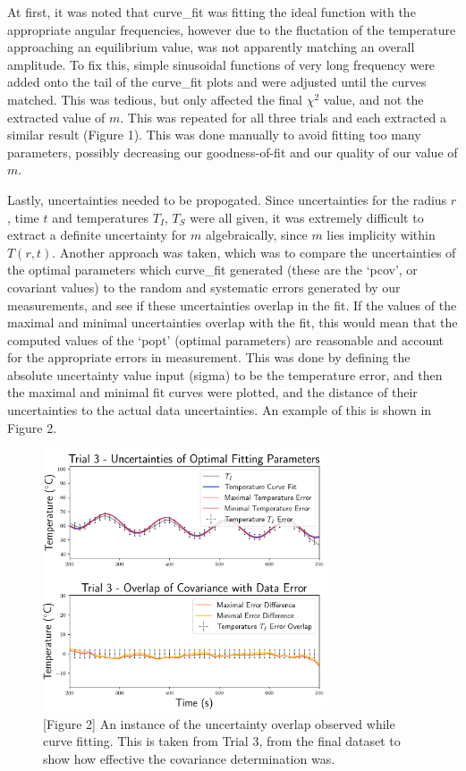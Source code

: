 \documentclass[11pt]{article}
\begin{document}
\begin{multicols}{2}
    At first, it was noted that curve\_fit was fitting the ideal function with the appropriate angular frequencies, however due to the fluctation of the temperature approaching an equilibrium value, was not apparently matching an overall amplitude. To fix this, simple sinusoidal functions of very long frequency were added onto the tail of the curve\_fit plots and were adjusted until the curves matched. This was tedious, but only affected the final $\chi^2$ value, and not the extracted value of $m$. This was repeated for all three trials and each extracted a similar result (Figure 1). This was done manually to avoid fitting too many parameters, possibly decreasing our goodness-of-fit and our quality of our value of $m$. 

    Lastly, uncertainties needed to be propogated. Since uncertainties for the radius $r$, time $t$ and temperatures $T_I, \, T_S$ were all given, it was extremely difficult to extract a definite uncertainty for $m$ algebraically, since $m$ lies implicity within $T(r, t)$. Another approach was taken, which was to compare the uncertainties of the optimal parameters which curve\_fit generated (these are the `pcov', or covariant values) to the random and systematic errors generated by our measurements, and see if these uncertainties overlap in the fit. If the values of the maximal and minimal uncertainties overlap with the fit, this would mean that the computed values of the `popt' (optimal parameters) are reasonable and account for the appropriate errors in measurement. This was done by defining the absolute uncertainty value input (sigma) to be the temperature error, and then the maximal and minimal fit curves were plotted, and the distance of their uncertainties to the actual data uncertainties. An example of this is shown in Figure 2.   
    
    \begin{figure}[H]
        \includegraphics[width=3.3in]{uncertainty example.png}
        \caption*{[Figure 2] An instance of the uncertainty overlap observed while curve fitting. This is taken from Trial 3, from the final dataset to show how effective the covariance determination was.}
    \end{figure}


\end{multicols}
\end{document}
